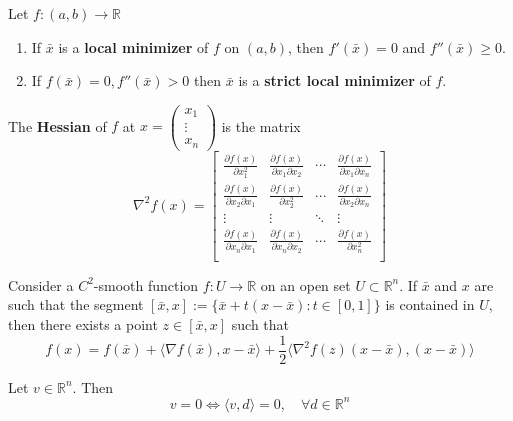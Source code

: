 \begin{corollary}
    Let $f: (a,b) \rightarrow \mathbb R$
    \begin{enumerate}
        \item If $\bar x$ is a \textbf{local minimizer} of $f$ on $(a,b)$, then $f'(\bar x) = 0$ and $f''(\bar x) \geq 0$.
        \item If $f(\bar x) = 0, f''(\bar x) > 0$ then $\bar x$ is a \textbf{strict local minimizer} of $f$.
    \end{enumerate}
\end{corollary}
\begin{definition}[Hessian]
    The \textbf{Hessian} of $f$ at $x = \begin{pmatrix}
        x_1 \\ \vdots \\ x_n
    \end{pmatrix}$ is the matrix
    $$\nabla^2 f(x) = \begin{bmatrix}
        \frac{\partial f(x)}{\partial x^2_1} & \frac{\partial f(x)}{\partial x_1 \partial x_2} & \cdots & \frac{\partial f(x)}{\partial x_1 \partial x_n} \\
        \frac{\partial f(x)}{\partial x_2 \partial x_1} & \frac{\partial f(x)}{\partial x_2^2} & \cdots & \frac{\partial f(x)}{\partial x_2 \partial x_n} \\
        \vdots & \vdots & \ddots & \vdots \\
        \frac{\partial f(x)}{\partial x_n \partial x_1} & \frac{\partial f(x)}{\partial x_n \partial x_2} & \cdots & \frac{\partial f(x)}{\partial x_n^2} \\
    \end{bmatrix}$$
\end{definition}
\begin{theorem}
    Consider a $C^2$-smooth function $f: U \rightarrow \mathbb R$ on an open set $U \subset \mathbb R^n$. If $\bar x$ and $x$ are such that the segment $[\bar x, x] := \{\bar x + t(x - \bar x): t \in [0,1]\}$ is contained in $U$, then there exists a point $z \in [\bar x, x]$ such that
    $$f(x) = f(\bar x) + \langle \nabla f(\bar x), x - \bar x \rangle + \frac{1}{2} \langle \nabla^2 f(z) (x - \bar x), (x - \bar x) \rangle$$
\end{theorem}
\begin{lemma}
    Let $v \in \mathbb R^n$. Then $$v = 0 \iff \langle v,d \rangle = 0, \quad \forall d \in \mathbb R^n$$
\end{lemma}

% 